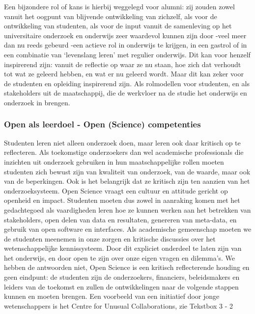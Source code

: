 \documentclass[empirical, authordate, ]{new-jote-article}
\begin{document}
	Een bijzondere rol of kans is hierbij weggelegd voor alumni: zij zouden zowel vanuit het oogpunt van blijvende ontwikkeling van zichzelf, als voor de ontwikkeling van studenten, als voor de input vanuit de samenleving op het universitaire onderzoek en onderwijs zeer waardevol kunnen zijn door -veel meer dan nu reeds gebeurd -een actieve rol in onderwijs te krijgen, in een gastrol of in een combinatie van ‘levenslang leren' met regulier onderwijs. Dit kan voor henzelf inspirerend zijn: vanuit de reflectie op waar ze nu staan, hoe zich dat verhoudt tot wat ze geleerd hebben, en wat er nu geleerd wordt. Maar dit kan zeker voor de studenten en opleiding inspirerend zijn. Als rolmodellen voor studenten, en als stakeholders uit de maatschappij, die de werkvloer na de studie het onderwijs en onderzoek in brengen.



	\subsubsection{Open als leerdoel - Open (Science) competenties}



	Studenten leren niet alleen onderzoek doen, maar leren ook daar kritisch op te reflecteren. Als toekomstige onderzoekers dan wel academische professionals die inzichten uit onderzoek gebruiken in hun maatschappelijke rollen moeten studenten zich bewust zijn van kwaliteit van onderzoek, van de waarde, maar ook van de beperkingen. Ook is het belangrijk dat ze kritisch zijn ten aanzien van het onderzoeksysteem. Open Science vraagt een cultuur en attitude gericht op openheid en impact. Studenten moeten dus zowel in aanraking komen met het gedachtegoed als vaardigheden leren hoe ze kunnen werken aan het betrekken van stakeholders, open delen van data en resultaten, genereren van meta-data, en gebruik van open software en interfaces. Als academische gemeenschap moeten we de studenten meenemen in onze zorgen en kritische discussies over het wetenschappelijke kennissysteem. Door dit expliciet onderdeel te laten zijn van het onderwijs, en door open te zijn over onze eigen vragen en dilemma's. We hebben de antwoorden niet, Open Science is een kritisch reflecterende houding en geen eindpunt: de studenten zijn de onderzoekers, financiers, beleidsmakers en leiders van de toekomst en zullen de ontwikkelingen naar de volgende stappen kunnen en moeten brengen. Een voorbeeld van een initiatief door jonge wetenschappers is het Centre for Unusual Collaborations, zie Tekstbox 3 - 2
\end{document}
